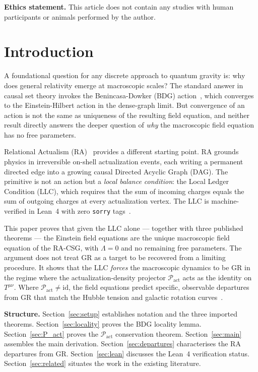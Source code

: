 \documentclass[11pt,a4paper]{article}
\newcommand{\Pact}{\mathcal{P}_{\mathrm{act}}}
\begin{document}
\medskip
\noindent\textbf{Ethics statement.}
This article does not contain any studies with human participants
or animals performed by the author.



\section{Introduction}
\label{sec:intro}

A foundational question for any discrete approach to quantum gravity
is: why does general relativity emerge at macroscopic scales? The
standard answer in causal set theory invokes the Benincasa-Dowker
(BDG) action~\citep{Benincasa2010}, which converges to the
Einstein-Hilbert action in the dense-graph limit. But convergence of
an action is not the same as uniqueness of the resulting field
equation, and neither result directly answers the deeper question of
\emph{why} the macroscopic field equation has no free parameters.

Relational Actualism (RA)~\citep{Sandeman2026RAQM} provides a
different starting point. RA grounds physics in irreversible on-shell
actualization events, each writing a permanent directed edge into a
growing causal Directed Acyclic Graph (DAG). The primitive is not an
action but a \emph{local balance condition}: the Local Ledger
Condition (LLC), which requires that the sum of incoming charges
equals the sum of outgoing charges at every actualization vertex.
The LLC is machine-verified in Lean~4 with zero \texttt{sorry}
tags~\citep{Sandeman2026RAGC}.

This paper proves that given the LLC alone --- together with three
published theorems --- the Einstein field equations are the unique
macroscopic field equation of the RA-CSG, with $\Lambda = 0$ and no
remaining free parameters. The argument does not treat GR as a target
to be recovered from a limiting procedure. It shows that the LLC
\emph{forces} the macroscopic dynamics to be GR in the regime where
the actualization-density projector $\Pact$ acts as the identity on
$T^{\mu\nu}$. Where $\Pact \neq \mathrm{id}$, the field equations
predict specific, observable departures from GR that match the Hubble
tension and galactic rotation curves~\citep{Sandeman2026RAGC,
Sandeman2026RADM}.

\medskip\noindent
\textbf{Structure.}
Section~\ref{sec:setup} establishes notation and the three imported
theorems. Section~\ref{sec:locality} proves the BDG locality lemma.
Section~\ref{sec:P_act} proves the $\Pact$ conservation theorem.
Section~\ref{sec:main} assembles the main derivation.
Section~\ref{sec:departures} characterises the RA departures from GR.
Section~\ref{sec:lean} discusses the Lean~4 verification status.
Section~\ref{sec:related} situates the work in the existing literature.
\end{document}
